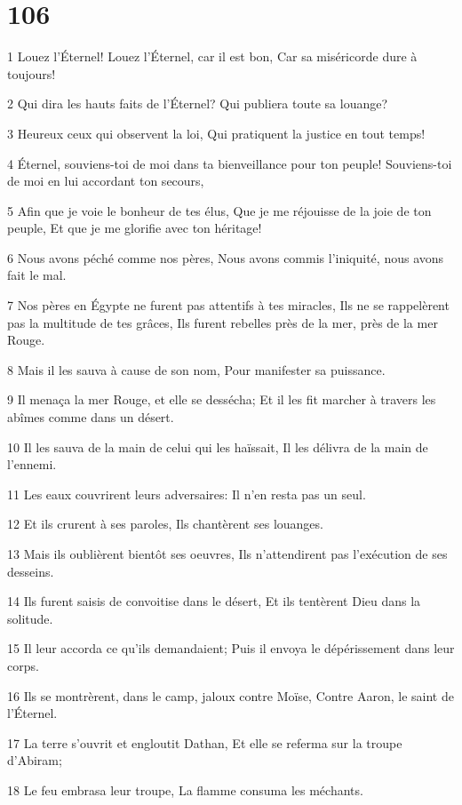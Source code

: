 \chapter{106}

\par 1 Louez l'Éternel! Louez l'Éternel, car il est bon, Car sa miséricorde dure à toujours!
\par 2 Qui dira les hauts faits de l'Éternel? Qui publiera toute sa louange?
\par 3 Heureux ceux qui observent la loi, Qui pratiquent la justice en tout temps!
\par 4 Éternel, souviens-toi de moi dans ta bienveillance pour ton peuple! Souviens-toi de moi en lui accordant ton secours,
\par 5 Afin que je voie le bonheur de tes élus, Que je me réjouisse de la joie de ton peuple, Et que je me glorifie avec ton héritage!
\par 6 Nous avons péché comme nos pères, Nous avons commis l'iniquité, nous avons fait le mal.
\par 7 Nos pères en Égypte ne furent pas attentifs à tes miracles, Ils ne se rappelèrent pas la multitude de tes grâces, Ils furent rebelles près de la mer, près de la mer Rouge.
\par 8 Mais il les sauva à cause de son nom, Pour manifester sa puissance.
\par 9 Il menaça la mer Rouge, et elle se dessécha; Et il les fit marcher à travers les abîmes comme dans un désert.
\par 10 Il les sauva de la main de celui qui les haïssait, Il les délivra de la main de l'ennemi.
\par 11 Les eaux couvrirent leurs adversaires: Il n'en resta pas un seul.
\par 12 Et ils crurent à ses paroles, Ils chantèrent ses louanges.
\par 13 Mais ils oublièrent bientôt ses oeuvres, Ils n'attendirent pas l'exécution de ses desseins.
\par 14 Ils furent saisis de convoitise dans le désert, Et ils tentèrent Dieu dans la solitude.
\par 15 Il leur accorda ce qu'ils demandaient; Puis il envoya le dépérissement dans leur corps.
\par 16 Ils se montrèrent, dans le camp, jaloux contre Moïse, Contre Aaron, le saint de l'Éternel.
\par 17 La terre s'ouvrit et engloutit Dathan, Et elle se referma sur la troupe d'Abiram;
\par 18 Le feu embrasa leur troupe, La flamme consuma les méchants.
